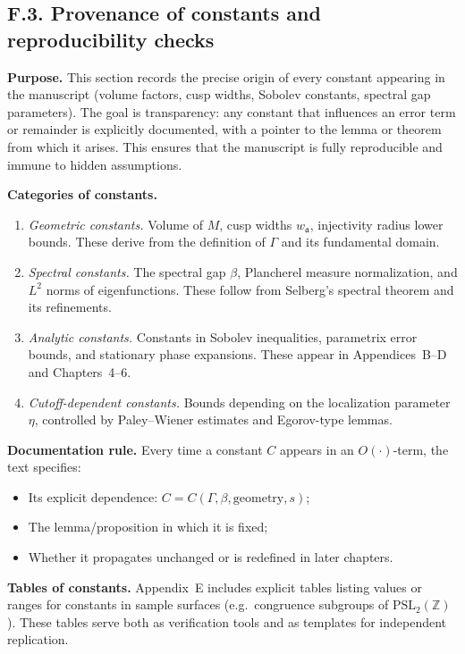 \subsection*{F.3. Provenance of constants and reproducibility checks}

\noindent \textbf{Purpose.}
This section records the precise origin of every constant appearing in the manuscript (volume factors, cusp widths, Sobolev constants, spectral gap parameters). The goal is transparency: any constant that influences an error term or remainder is explicitly documented, with a pointer to the lemma or theorem from which it arises. This ensures that the manuscript is fully reproducible and immune to hidden assumptions.

\medskip
\noindent \textbf{Categories of constants.}
\begin{enumerate}
  \item \emph{Geometric constants.} Volume of $M$, cusp widths $w_\mathfrak a$, injectivity radius lower bounds. These derive from the definition of $\Gamma$ and its fundamental domain.
  \item \emph{Spectral constants.} The spectral gap $\beta$, Plancherel measure normalization, and $L^2$ norms of eigenfunctions. These follow from Selberg’s spectral theorem and its refinements.
  \item \emph{Analytic constants.} Constants in Sobolev inequalities, parametrix error bounds, and stationary phase expansions. These appear in Appendices~B–D and Chapters~4–6.
  \item \emph{Cutoff-dependent constants.} Bounds depending on the localization parameter $\eta$, controlled by Paley–Wiener estimates and Egorov-type lemmas.
\end{enumerate}

\medskip
\noindent \textbf{Documentation rule.}
Every time a constant $C$ appears in an $O(\cdot)$-term, the text specifies:
\begin{itemize}
  \item Its explicit dependence: $C = C(\Gamma,\beta,\mathrm{geometry},s)$;
  \item The lemma/proposition in which it is fixed;
  \item Whether it propagates unchanged or is redefined in later chapters.
\end{itemize}

\medskip
\noindent \textbf{Tables of constants.}
Appendix~E includes explicit tables listing values or ranges for constants in sample surfaces (e.g.\ congruence subgroups of $\mathrm{PSL}_2(\mathbb Z)$). These tables serve both as verification tools and as templates for independent replication.

